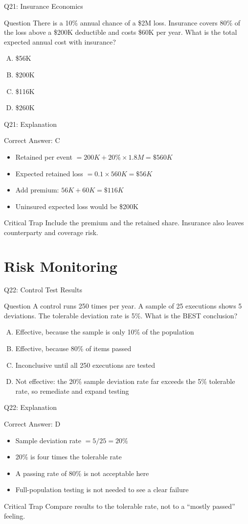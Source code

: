 \documentclass[aspectratio=169]{beamer}
\newcommand{\hq}[7]{%
	\begin{frame}{Q#1: #2}
		\begin{block}{Question}
			#3
		\end{block}
		\begin{enumerate}[(A)]
			#4
		\end{enumerate}
	\end{frame}
	\begin{frame}{Q#1: Explanation}
		\begin{block}{Correct Answer: #5}
			\begin{itemize}
				#6
			\end{itemize}
		\end{block}
		\begin{alertblock}{Critical Trap}
			#7
		\end{alertblock}
	\end{frame}
}
\begin{document}
	\hq{21}{Insurance Economics}
	{There is a 10\% annual chance of a \$2M loss. Insurance covers 80\% of the loss above a \$200K deductible and costs \$60K per year. What is the total expected annual cost with insurance?}
	{\item \$56K
		\item \$200K
		\item \$116K
		\item \$260K}
	{C}
	{\item Retained per event $= 200K + 20\% \times 1.8M = \$560K$
		\item Expected retained loss $= 0.1 \times 560K = \$56K$
		\item Add premium: $56K + 60K = \$116K$
		\item Uninsured expected loss would be \$200K}
	{Include the premium and the retained share. Insurance also leaves counterparty and coverage risk.}
	
	\section{Risk Monitoring}
	
	\hq{22}{Control Test Results}
	{A control runs 250 times per year. A sample of 25 executions shows 5 deviations. The tolerable deviation rate is 5\%. What is the BEST conclusion?}
	{\item Effective, because the sample is only 10\% of the population
		\item Effective, because 80\% of items passed
		\item Inconclusive until all 250 executions are tested
		\item Not effective: the 20\% sample deviation rate far exceeds the 5\% tolerable rate, so remediate and expand testing}
	{D}
	{\item Sample deviation rate $= 5/25 = 20\%$
		\item 20\% is four times the tolerable rate
		\item A passing rate of 80\% is not acceptable here
		\item Full-population testing is not needed to see a clear failure}
	{Compare results to the tolerable rate, not to a ``mostly passed'' feeling.}
	
\end{document}
